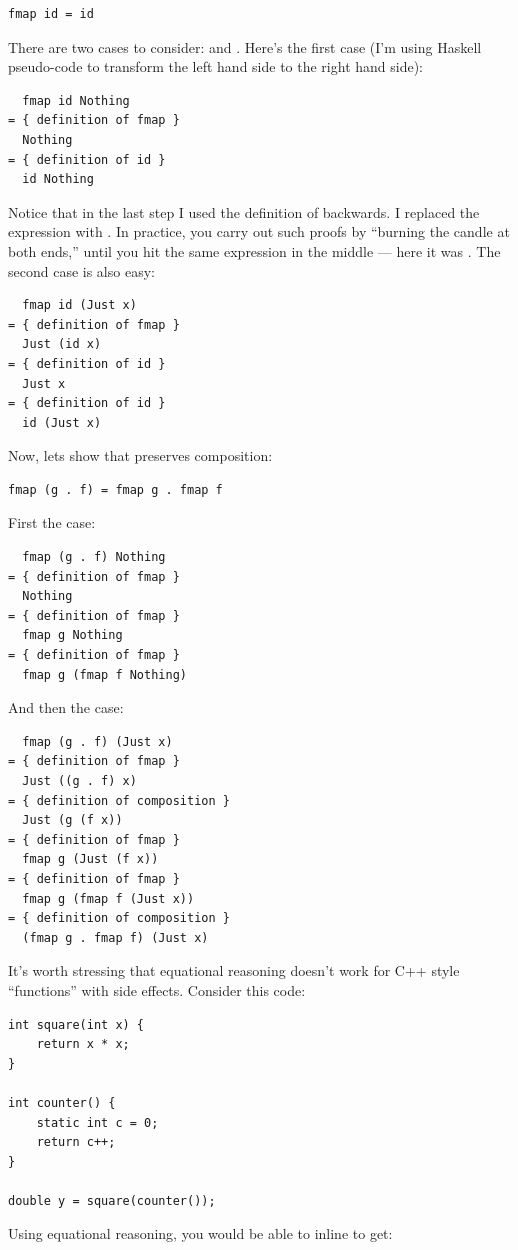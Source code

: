 \begin{verbatim}
fmap id = id
\end{verbatim}
There are two cases to consider:  and .
Here's the first case (I'm using Haskell pseudo-code to transform the
left hand side to the right hand side):

\begin{verbatim}
  fmap id Nothing
= { definition of fmap }
  Nothing
= { definition of id } 
  id Nothing
\end{verbatim}
Notice that in the last step I used the definition of 
backwards. I replaced the expression  with
. In practice, you carry out such proofs by
``burning the candle at both ends,'' until you hit the same expression
in the middle --- here it was . The second case is also
easy:

\begin{verbatim}
  fmap id (Just x)
= { definition of fmap }
  Just (id x)
= { definition of id }
  Just x
= { definition of id }
  id (Just x)
\end{verbatim}
Now, lets show that  preserves composition:

\begin{verbatim}
fmap (g . f) = fmap g . fmap f
\end{verbatim}
First the  case:

\begin{verbatim}
  fmap (g . f) Nothing
= { definition of fmap }
  Nothing
= { definition of fmap }
  fmap g Nothing
= { definition of fmap }
  fmap g (fmap f Nothing)
\end{verbatim}
And then the  case:

\begin{verbatim}
  fmap (g . f) (Just x)
= { definition of fmap }
  Just ((g . f) x)
= { definition of composition }
  Just (g (f x))
= { definition of fmap }
  fmap g (Just (f x))
= { definition of fmap }
  fmap g (fmap f (Just x))
= { definition of composition }
  (fmap g . fmap f) (Just x)
\end{verbatim}
It's worth stressing that equational reasoning doesn't work for C++
style ``functions'' with side effects. Consider this code:

\begin{verbatim}
int square(int x) { 
    return x * x;
}

int counter() { 
    static int c = 0;
    return c++;
}

double y = square(counter());
\end{verbatim}
Using equational reasoning, you would be able to inline 
to get:

